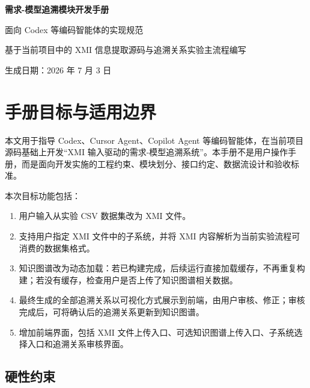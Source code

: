 \documentclass[11pt,a4paper]{article}
\begin{document}
\begin{titlepage}
  \centering
  \vspace*{34mm}
  {\Huge\bfseries 需求-模型追溯模块开发手册\par}
  \vspace{10mm}
  {\Large 面向 Codex 等编码智能体的实现规范\par}
  \vspace{16mm}
  {\large 基于当前项目中的 XMI 信息提取源码与追溯关系实验主流程编写\par}
  \vfill
  {\large 生成日期：2026 年 7 月 3 日\par}
\end{titlepage}

\tableofcontents
\newpage

\section{手册目标与适用边界}

本文用于指导 Codex、Cursor Agent、Copilot Agent 等编码智能体，在当前项目源码基础上开发“XMI 输入驱动的需求-模型追溯系统”。本手册不是用户操作手册，而是面向开发实施的工程约束、模块划分、接口约定、数据流设计和验收标准。

本次目标功能包括：
\begin{enumerate}
  \item 用户输入从实验 CSV 数据集改为 XMI 文件。
  \item 支持用户指定 XMI 文件中的子系统，并将 XMI 内容解析为当前实验流程可消费的数据集格式。
  \item 知识图谱改为动态加载：若已构建完成，后续运行直接加载缓存，不再重复构建；若没有缓存，检查用户是否上传了知识图谱相关数据。
  \item 最终生成的全部追溯关系以可视化方式展示到前端，由用户审核、修正；审核完成后，可将确认后的追溯关系更新到知识图谱。
  \item 增加前端界面，包括 XMI 文件上传入口、可选知识图谱上传入口、子系统选择入口和追溯关系审核界面。
\end{enumerate}

\subsection{硬性约束}
\end{document}
